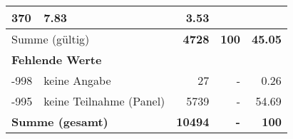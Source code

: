 \begin{longtable}{lXrrr}
       \num{370} &
       \num[round-mode=places,round-precision=2]{7.83} &
         \num[round-mode=places,round-precision=2]{3.53} \\
     \midrule
     \multicolumn{2}{l}{Summe (gültig)} &
       \textbf{\num{4728}} &
     \textbf{\num{100}} &
       \textbf{\num[round-mode=places,round-precision=2]{45.05}} \\
     \multicolumn{5}{l}{\textbf{Fehlende Werte}}\\
       -998 &
       keine Angabe &
         \num{27} &
        - &
         \num[round-mode=places,round-precision=2]{0.26} \\
       -995 &
       keine Teilnahme (Panel) &
         \num{5739} &
        - &
         \num[round-mode=places,round-precision=2]{54.69} \\
     \midrule
     \multicolumn{2}{l}{\textbf{Summe (gesamt)}} &
          \textbf{\num{10494}} &
        \textbf{-} &
        \textbf{\num{100}} \\
     \bottomrule
     \end{longtable}
     
